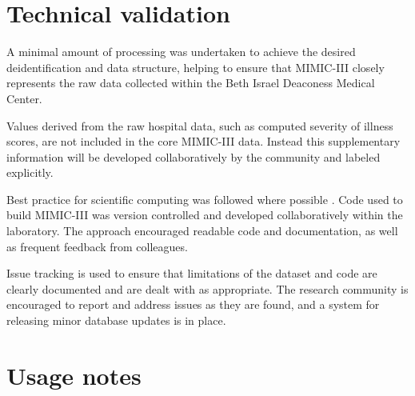 \documentclass[english]{article}
\begin{document}
\section*{Technical validation}


A minimal amount of processing was undertaken to achieve the desired deidentification and data structure, helping to ensure that MIMIC-III closely represents the raw data collected within the Beth Israel Deaconess Medical Center.

Values derived from the raw hospital data, such as computed severity of illness scores, are not included in the core MIMIC-III data. Instead this supplementary information will be developed collaboratively by the community and labeled explicitly.

Best practice for scientific computing was followed where possible \cite{cite4}. Code used to build MIMIC-III was version controlled and developed collaboratively within the laboratory. The approach encouraged readable code and documentation, as well as frequent feedback from colleagues.

Issue tracking is used to ensure that limitations of the dataset and code are clearly documented and are dealt with as appropriate. The research community is encouraged to report and address issues as they are found, and a system for releasing minor database updates is in place.


\section*{Usage notes}

\end{document}
